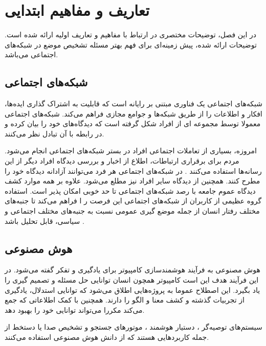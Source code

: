 
\chapter{تعاریف و مفاهیم ابتدایی}
\thispagestyle{empty}

در این فصل، توضیحات مختصری در ارتباط با مفاهیم و تعاریف اولیه ارائه شده است. توضیحات ارائه شده، پیش زمینە‌ای برای فهم بهتر مسئله تشخیص موضع در شبکه‌های اجتماعی می‌باشد.

\section{شبکه‌های اجتماعی}
شبکه‌های اجتماعی
یک فناوری مبتنی بر رایانه است که قابلیت به اشتراک گذاری ایدە‌ها، افکار و اطلاعات
را از طریق شبکه‌ها و جوامع مجازی فراهم می‌کند. شبکه‌‌های اجتماعی معمولا توسط مجموعە ای از افراد شکل گرفته است که دیدگاە‌های خود را بیان کرده و در رابطه با آن تبادل نظر می‌کنند.

امروزه، بسیاری از تعاملات اجتماعی افراد در بستر شبکه‌های اجتماعی انجام می‌شود. مردم برای برقراری ارتباطات، اطلاع از اخبار و بررسی دیدگاه افراد دیگر از این رسانە‌ها استفاده می‌کنند
\cite{CAN2021101501}.
در شبکه‌های اجتماعی هر فرد می‌توانند آزادانه دیدگاه خود را مطرح کنند. همچنین از دیدگاه سایر افراد نیز مطلع می‌شود. علاوه بر همه موارد کشف دیدگاه عموم جامعه با رصد شبکه‌های اجتماعی تا حد خوبی امکان پذیر است. استفاده گروه عظیمی از کاربران از شبکه‌های اجتماعی این فرصت ر ا فراهم می‌کند تا جنبە‌های مختلف رفتار انسان از جمله موضع گیری عمومی نسبت به جنبە‌های مختلف اجتماعی و سیاسی، قابل تحلیل
باشد
\cite{ALDAYEL2021102597}.

\section{هوش مصنوعی}
هوش مصنوعی
به فرآیند هوشمندسازی کامپیوتر برای یادگیری و تفکر گفته می‌شود. در این فرآیند هدف این است کامپیوتر همچون انسان توانایی حل مسئله و تصمیم گیری را یاد بگیرد. این اصطلاح عموما به پروژە‌هایی اطلاق می‌شود که توانایی استدلال، یادگیری از تجربیات گذشته و کشف معنا و الگو را دارند. همچنین با کمک اطلاعاتی که جمع می‌کند مکررا می‌تواند توانایی خود را بهبود دهد.

سیستم‌های توصیه‌گر
،
دستیار هوشمند
،
موتورهای جستجو و تشخیص صدا یا دستخط از جمله کاربردهایی هستند که از دانش هوش مصنوعی استفاده می‌کنند.

